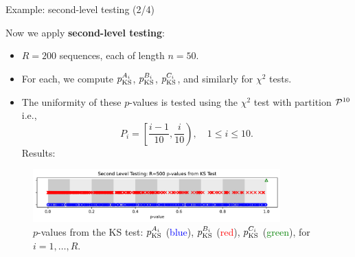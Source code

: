 \documentclass[aspectratio=169]{beamer}
\begin{document}
\begin{frame}{Example: second-level testing (2/4)}

Now we apply \textbf{second-level testing}:
\begin{itemize}
 \item $R = 200$ sequences, each of length $n = 50$.
 \item For each, we compute $p^{A_i}_{\rm KS}$, $p^{B_i}_{\rm KS}$, $p^{C_i}_{\rm KS}$,
       and similarly for $\chi^2$ tests.
 \item The uniformity of these $p$-values is tested using the $\chi^2$ test with   partition
       ${\cal P}^{10}$ i.e.,
       $$P_i = \left[\frac{i-1}{10}, \frac{i}{10} \right), \quad 1 \leq i \leq 10.$$
       Results:

\end{itemize}
\begin{figure}[h]
\centering
\includegraphics[width=0.85\textwidth]{figures_pdf/ch2_prng_sets_A_B_C_second_level_KS_pvalues.pdf}
\caption{$p$-values from the KS test:
$p^{A_i}_{\rm KS}$ (\textcolor{blue}{blue}),
$p^{B_i}_{\rm KS}$ (\textcolor{red}{red}),
$p^{C_i}_{\rm KS}$ (\textcolor{green}{green}),
for $i = 1,\ldots,R$.}
\label{fig:chi2_ks_p_values}
\end{figure}
\end{frame}
\end{document}
